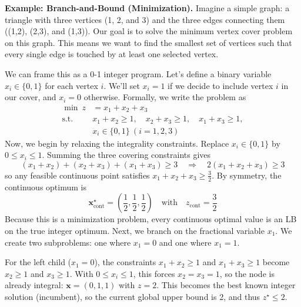 \begin{exampleBox}
    \textbf{Example: Branch-and-Bound (Minimization).}
    Imagine a simple graph: a triangle with three vertices (1, 2, and 3) and the three edges connecting them ((1,2), (2,3), and (1,3)). Our goal is to solve the minimum vertex cover problem on this graph. This means we want to find the smallest set of vertices such that every single edge is touched by at least one selected vertex.
    
    We can frame this as a 0-1 integer program. Let's define a binary variable $x_i \in \{0, 1\}$ for each vertex $i$. We'll set $x_i=1$ if we decide to include vertex $i$ in our cover, and $x_i=0$ otherwise. Formally, we write the problem as
    \begin{equation}
    \begin{aligned}
    \min\ z &= x_1+x_2+x_3\\
    \text{s.t. }& x_1+x_2\ge 1,\quad x_2+x_3\ge 1,\quad x_1+x_3\ge 1,\\
    & x_i\in\{0,1\}\ (i=1,2,3)
    \end{aligned}
    \end{equation}    
    Now, we begin by relaxing the integrality constraints. Replace $x_i\in\{0,1\}$ by $0\le x_i\le 1$. Summing the three covering constraints gives
    \begin{equation}
    (x_1{+}x_2)+(x_2{+}x_3)+(x_1{+}x_3) \ge 3
    \quad\Longrightarrow\quad
    2(x_1{+}x_2{+}x_3) \ge 3
    \end{equation}
    so any feasible continuous point satisfies $x_1{+}x_2{+}x_3\ge \tfrac{3}{2}$. By symmetry, the continuous optimum is
    \begin{equation}
        \mathbf{x}^\star_{\mathrm{cont}}=\left(\frac{1}{2},\frac{1}{2},\frac{1}{2}\right) \quad \text{with} \quad z_{\mathrm{cont}}=\frac{3}{2}
    \end{equation}
    Because this is a minimization problem, every continuous optimal value is an LB on the true integer optimum. Next, we branch on the fractional variable $x_1$. We create two subproblems: one where $x_1=0$ and one where $x_1=1$.
    
    For the left child ($x_1=0$), the constraints $x_1{+}x_2\ge 1$ and $x_1{+}x_3\ge 1$ become $x_2\ge 1$ and $x_3\ge 1$. With $0\le x_i\le 1$, this forces $x_2=x_3=1$, so the node is already integral: $\mathbf{x}=(0,1,1)$ with $z=2$. This becomes the best known integer solution (incumbent), so the current global upper bound is 2, and thus \(z^\star \le 2\).
    

\end{exampleBox}

